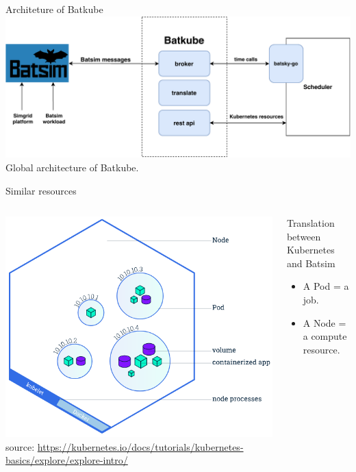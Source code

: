 \documentclass[12pt, aspectratio=43]{beamer}
\begin{document}
\begin{frame}{Architeture of Batkube}
	\centering
	\includegraphics[width=\textwidth]{../imgs/batkube-architecture-3-synchro.pdf}
	\small{Global architecture of Batkube.}
\end{frame}


\begin{frame}{Similar resources}
	\begin{columns}
		\centering
		\includegraphics[width=\textwidth]{../imgs/node-overview.png}
		\tiny{source: \url{https://kubernetes.io/docs/tutorials/kubernetes-basics/explore/explore-intro/}}

		\begin{block}{Translation between Kubernetes and Batsim}
			\begin{itemize}
				\item A Pod = a job.
				\item A Node = a compute resource.
			\end{itemize}
		\end{block}
	\end{columns}
\end{frame}
\end{document}

